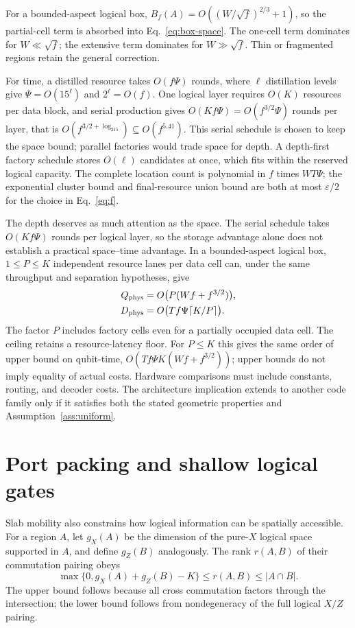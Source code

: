 For a bounded-aspect logical box,
$B_f(A)=O((W/\sqrt f)^{2/3}+1)$, so the partial-cell term is absorbed into
Eq.~\eqref{eq:box-space}. The one-cell term dominates for $W\ll\sqrt f$;
the extensive term dominates for $W\gg\sqrt f$. Thin or fragmented regions
retain the general correction.

For time, a distilled resource takes $O(f\Psi)$ rounds, where $\ell$
distillation levels give $\Psi=O(15^\ell)$ and $2^\ell=O(f)$. One logical
layer requires $O(K)$ resources per data block, and serial production gives
$O(Kf\Psi)=O(f^{3/2}\Psi)$ rounds per layer, that is
$O(f^{3/2+\log_215})\subseteq O(f^{5.41})$. This serial schedule is chosen
to keep the space bound; parallel factories would trade space for depth. A depth-first factory schedule
stores $O(\ell)$ candidates at once, which fits within the reserved logical
capacity. The complete location count is polynomial in $f$ times
$WT\Psi$; the exponential cluster bound and final-resource union bound are
both at most $\varepsilon/2$ for the choice in Eq.~\eqref{eq:f}.


The depth deserves as much attention as the space. The serial schedule
takes $O(Kf\Psi)$ rounds per logical layer, so the storage advantage alone
does not establish a practical space--time advantage. In a bounded-aspect
logical box, $1\le P\le K$ independent resource lanes per data cell can,
under the same throughput and separation hypotheses, give
\begin{align}
 Q_{\rm phys}&=O\bigl(P(Wf+f^{3/2})\bigr),\nonumber\\
 D_{\rm phys}&=O\bigl(Tf\Psi\lceil K/P\rceil\bigr).
 \label{eq:parallel}
\end{align}
The factor $P$ includes factory cells even for a partially occupied data
cell. The ceiling retains a resource-latency floor. For $P\le K$ this gives
the same order of upper bound on qubit-time,
$O(Tf\Psi K(Wf+f^{3/2}))$; upper bounds do not imply equality of actual
costs. Hardware comparisons must include constants, routing, and decoder
costs. The architecture implication extends to another code family only
if it satisfies both the stated geometric properties and
Assumption~\ref{ass:uniform}.

\section{Port packing and shallow logical gates}
\label{sec:structure}
Slab mobility also constrains how logical information can be spatially
accessible. For a region $A$, let $g_X(A)$ be the dimension of the pure-$X$
logical space supported in $A$, and define $g_Z(B)$ analogously. The rank
$r(A,B)$ of their commutation pairing obeys
\begin{equation}
 \max\{0,g_X(A)+g_Z(B)-K\}\le r(A,B)\le |A\cap B|.
 \label{eq:overlap}
\end{equation}
The upper bound follows because all cross commutation factors through the
intersection; the lower bound follows from nondegeneracy of the full
logical $X/Z$ pairing.

